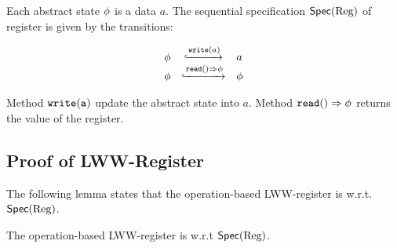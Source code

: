 Each abstract state $\abstate$ is a data $a$. The sequential specification $\specReg$ of register is given by the transitions:

\[
  \begin{array}{rcl}
    \abstate
    & \specarrow{\alabelshort[\mathtt{write}]{a}}
    & a\\
    \abstate
    & \specarrow{\alabellong[\mathtt{read}]{}{\abstate}{}}
    & \abstate
  \end{array}
\]

Method $\alabelshort[{\tt write}]{a}$ update the abstract state into $a$. Method $\alabellong[{\tt read}]{}{\abstate}{}$ returns the value of the register.




\subsection{Proof of LWW-Register}
\label{subsec:proof of LWW-register}

The following lemma states that the operation-based LWW-register is \crdtlinearizable{} w.r.t. $\specReg$.

\begin{lemma}
\label{lemma:operation-based LWW-register is correct}
The operation-based LWW-register is \crdtlinearizable{} w.r.t $\specReg$.
\end{lemma}

